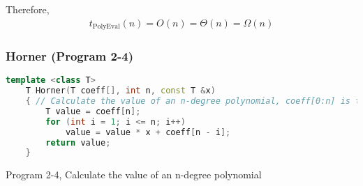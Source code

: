 \documentclass{article}
\begin{document}
Therefore,
\begin{align}
    \boxed{t_{\text{PolyEval}}(n) = O(n) = \Theta(n) = \Omega(n)}
\end{align}

\subsubsection{Horner (Program 2-4)}
\begin{lstlisting}[language=C++]
    template <class T>
    T Horner(T coeff[], int n, const T &x)
    { // Calculate the value of an n-degree polynomial, coeff[0:n] is the coefficient of the polynomial
        T value = coeff[n];
        for (int i = 1; i <= n; i++)
            value = value * x + coeff[n - i];
        return value;
    }
\end{lstlisting}
\begin{center}
    Program 2-4, Calculate the value of an n-degree polynomial
\end{center}
\end{document}
